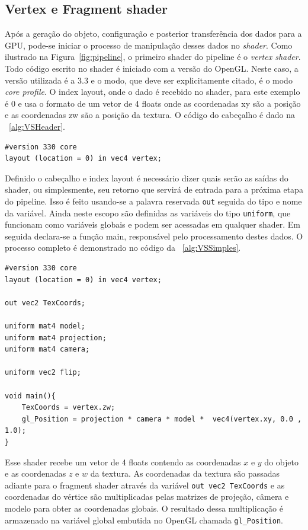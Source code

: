\documentclass[12pt, 
openright, 
oneside, 
a4paper,    
brazil]{facom-ufu-abntex2}
\begin{document}
\subsection{Vertex e Fragment shader}
Após a geração do objeto, configuração e posterior transferência dos dados para a GPU, pode-se iniciar o processo de manipulação desses dados no \textit{shader}. Como ilustrado na Figura~\ref{fig:pipeline}, o primeiro shader do pipeline é o \textit{vertex shader}. Todo código escrito no shader é iniciado com a versão do OpenGL. Neste caso, a versão utilizada é a 3.3 e o modo, que deve ser explicitamente citado, é o modo \textit{core profile}.
O index layout, onde o dado é recebido no shader, para este exemplo é 0 e usa o formato de um vetor de 4 floats onde as coordenadas xy são a posição e as coordenadas zw são a posição da textura. O código do cabeçalho é dado na \lstlistingname~\ref{alg:VSHeader}.
\begin{lstlisting}[caption=Cabeçalho do Vertex shader, label={alg:VSHeader}]
#version 330 core
layout (location = 0) in vec4 vertex; 		
\end{lstlisting}

Definido o cabeçalho e index layout é necessário dizer quais serão as saídas do shader, ou simplesmente, seu retorno que servirá de entrada para a próxima etapa do pipeline. Isso é feito usando-se a palavra reservada \texttt{out} seguida do tipo e nome da variável. Ainda neste escopo são definidas as variáveis do tipo \texttt{uniform}, que funcionam como variáveis globais e podem ser acessadas em qualquer shader. Em seguida declara-se a função main, responsável pelo processamento destes dados. O processo completo é demonstrado no código da \lstlistingname~\ref{alg:VSSimples}.

 \begin{lstlisting}[caption=Vertex shader simples, label={alg:VSSimples}]
#version 330 core
layout (location = 0) in vec4 vertex; 

out vec2 TexCoords;

uniform mat4 model;
uniform mat4 projection;
uniform mat4 camera;

uniform vec2 flip;

void main(){
	TexCoords = vertex.zw;
	gl_Position = projection * camera * model *  vec4(vertex.xy, 0.0 , 1.0);
}
\end{lstlisting}

Esse shader recebe um vetor de 4 floats contendo as coordenadas $x$ e $y$ do objeto e as coordenadas $z$ e $w$ da textura. As coordenadas da textura são passadas adiante para o fragment shader através da variável \texttt{out vec2 TexCoords} e as coordenadas do vértice são multiplicadas pelas matrizes de projeção, câmera e modelo para obter as coordenadas globais. O resultado dessa multiplicação é armazenado na variável global embutida no OpenGL chamada \texttt{gl_Position}.
\end{document}
